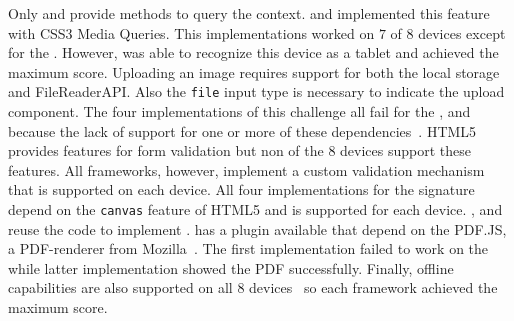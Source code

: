 \documentclass[a4paper]{artikel3}
\newcommand{\code}[1]{\texttt{#1}}
\begin{document}
\begin{table}[t]
\centering
{}
\caption{Performance for \st{}~(\sta), \kendo{}~(\kendoa), \jqm{}~(\jqma) en \lungo{}~(\lungoa). Less is better.}
\label{tabel:evaluatie-performantie}
\end{table}

Only \sta{} and \kendoa{} provide methods to query the context.
\jqma{} and \lungo{} implemented this feature with CSS3 Media Queries.
This implementations worked on $7$ of $8$ devices except for the \gtab.
However,  \kendoa{} was able to recognize this device as a tablet and achieved the maximum score.
Uploading an image requires support for both the local storage and FileReaderAPI.  
Also the \code{file} input type is necessary to indicate the upload component.
The four implementations of this challenge all fail for the \htc{}, \gtab{} and \ipadi{} because the lack of support for one or more of these dependencies~\cite{Deveria2013c}.
HTML5 provides features for form validation but non of the $8$ devices support these features.
All frameworks, however,  implement a custom validation mechanism that is supported on each device.
All four implementations for the signature depend on the \code{canvas} feature of HTML5 and is supported for each device.
\kendoa{}, \jqma{} and \lungo{} reuse the code to implement .
\sta{} has a plugin available that depend on the PDF.JS,  a PDF-renderer from Mozilla~\cite{Gal2010}.
The first implementation failed to work on the \gs{} while latter implementation showed the PDF successfully.
Finally, offline capabilities are also supported on all $8$ devices~\cite{Deveria2013c} so each framework achieved the maximum score.
\end{document}
